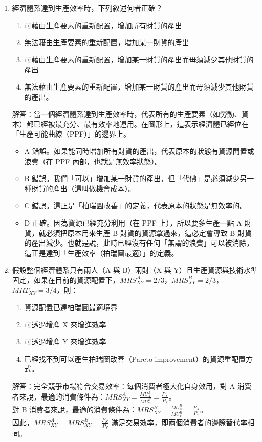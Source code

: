 \documentclass[12pt, a4paper]{article}
\begin{document}
\begin{enumerate}
    \item 經濟體系達到生產效率時，下列敘述何者正確？
        \begin{enumerate}[label=\Alph*.]
            \item 可藉由生產要素的重新配置，增加所有財貨的產出
            \item 無法藉由生產要素的重新配置，增加某一財貨的產出
            \item 可藉由生產要素的重新配置，增加某一財貨的產出而毋須減少其他財貨的產出
            \item 無法藉由生產要素的重新配置，增加某一財貨的產出而毋須減少其他財貨的產出。
        \end{enumerate}
        解答：當一個經濟體系達到生產效率時，代表所有的生產要素（如勞動、資本）都已經被最充分、最有效率地運用。在圖形上，這表示經濟體已經位在「生產可能曲線（PPF）」的邊界上。
        \begin{itemize}
            \item A 錯誤。如果能同時增加所有財貨的產出，代表原本的狀態有資源閒置或浪費（在 PPF 內部，也就是無效率狀態）。
            \item B 錯誤。我們「可以」增加某一財貨的產出，但「代價」是必須減少另一種財貨的產出（這叫做機會成本）。
            \item C 錯誤。這正是「柏瑞圖改善」的定義，代表原本的狀態是無效率的。
            \item D 正確。因為資源已經充分利用（在 PPF 上），所以要多生產一點 A 財貨，就必須把原本用來生產 B 財貨的資源拿過來，這必定會導致 B 財貨的產出減少。也就是說，此時已經沒有任何「無謂的浪費」可以被消除，這正是達到「生產效率（柏瑞圖最適）」的定義。
        \end{itemize}

    \newpage

    \item 假設整個經濟體系只有兩人（A 與 B）兩財（X 與 Y）且生產資源與技術水準固定，如果在目前的資源配置下，\(MRS_{XY}^A=2/3\)，\(MRS_{XY}^B=2/3\)，\(MRT_{XY} =3/4\)，則：
        \begin{enumerate}[label=\Alph*.]
            \item 資源配置已達柏瑞圖最適境界
            \item 可透過增產 X 來增進效率
            \item 可透過增產 Y 來增進效率
            \item 已經找不到可以產生柏瑞圖改善（Pareto improvement）的資源重配置方式。
        \end{enumerate}
        解答：完全競爭市場符合交易效率：每個消費者極大化自身效用，對 A 消費者來說，最適的消費條件為：$MRS_{XY}^A = \frac{MU_X^A}{MU_Y^B} = \frac{P_X}{P_Y}$。\\
        對 B 消費者來說，最適的消費條件為：$MRS_{XY}^B = \frac{MU_X^B}{MU_Y^B} = \frac{P_X}{P_Y}$。\\
        因此，$MRS_{XY}^A = MRS_{XY}^B = \frac{P_X}{P_Y}$ 滿足交易效率，即兩個消費者的邊際替代率相同。


\end{enumerate}
\end{document}

